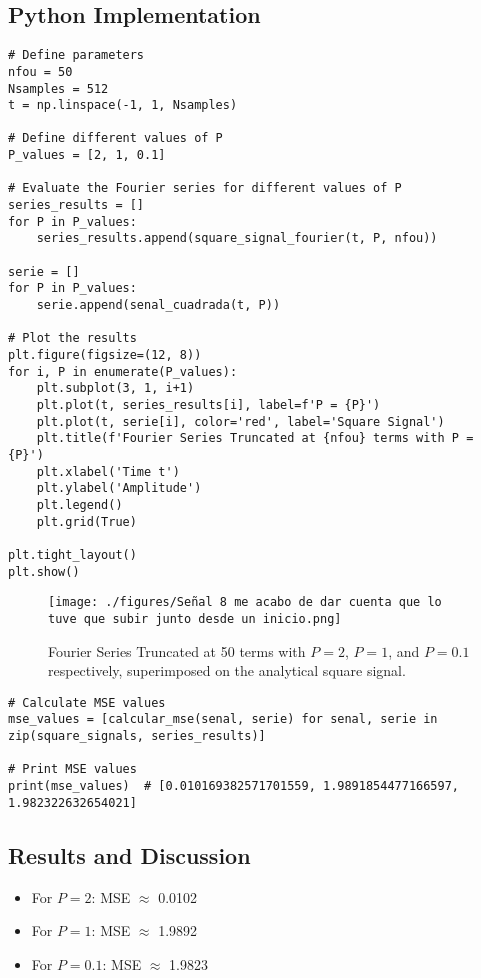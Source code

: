 \documentclass[10pt]{article}
\theoremstyle{definition}
\theoremstyle{remark}
\theoremstyle{definition}
\numberwithin{equation}{prob}
\begin{document}
\subsection*{Python Implementation}

\begin{lstlisting}
# Define parameters
nfou = 50
Nsamples = 512
t = np.linspace(-1, 1, Nsamples)

# Define different values of P
P_values = [2, 1, 0.1]

# Evaluate the Fourier series for different values of P
series_results = []
for P in P_values:
    series_results.append(square_signal_fourier(t, P, nfou))

serie = []
for P in P_values:
    serie.append(senal_cuadrada(t, P))

# Plot the results
plt.figure(figsize=(12, 8))
for i, P in enumerate(P_values):
    plt.subplot(3, 1, i+1)
    plt.plot(t, series_results[i], label=f'P = {P}')
    plt.plot(t, serie[i], color='red', label='Square Signal')
    plt.title(f'Fourier Series Truncated at {nfou} terms with P = {P}')
    plt.xlabel('Time t')
    plt.ylabel('Amplitude')
    plt.legend()
    plt.grid(True)

plt.tight_layout()
plt.show()
\end{lstlisting}



\begin{figure}[h!]
    \centering
    \texttt{[image: ./figures/Señal 8 me acabo de dar cuenta que lo tuve que subir junto desde un inicio.png]}
    \caption{Fourier Series Truncated at 50 terms with \( P = 2 \), \( P = 1 \), and \( P = 0.1 \) respectively, superimposed on the analytical square signal.}
\end{figure}

\begin{lstlisting}
# Calculate MSE values
mse_values = [calcular_mse(senal, serie) for senal, serie in zip(square_signals, series_results)]

# Print MSE values
print(mse_values)  # [0.010169382571701559, 1.9891854477166597, 1.982322632654021]
\end{lstlisting}


\subsection*{Results and Discussion}

    \begin{itemize}
        \item For \( P = 2 \): MSE \( \approx \) 0.0102
        \item For \( P = 1 \): MSE \( \approx \) 1.9892
        \item For \( P = 0.1 \): MSE \( \approx \) 1.9823
    \end{itemize}
        
\end{document}
